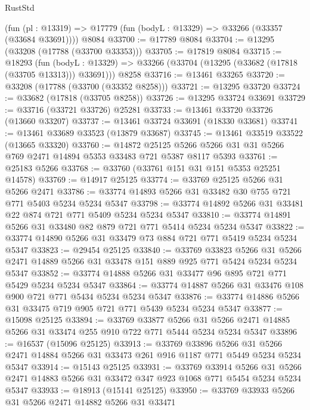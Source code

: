 \begin{lexlean}{RustStd}
\begin{coremodule}
    (fun (pl : @13319) => @17779 (fun (bodyL : @13329) => @33266 (@33357 (@33684 @33691))))
    @8084
@33700 := @17789 @8084
@33704 := @13295 (@33208 (@17788 (@33700 @33353)))
@33705 := @17819 @8084
@33715 := @18293
    (fun (bodyL : @13329) => @33266 (@33704 (@13295 (@33682 (@17818 (@33705 @13313))) @33691)))
    @8258
@33716 := @13461 @33265
@33720 := @33208 (@17788 (@33700 (@33352 @8258)))
@33721 := @13295 @33720
@33724 := @33682 (@17818 (@33705 @8258))
@33726 := @13295 @33724 @33691
@33729 := @33716 (@33721 @33726) @25281
@33733 := @13461 @33720 @33726 (@13660 @33207)
@33737 := @13461 @33724 @33691 (@18330 @33681)
@33741 := @13461 @33689 @33523 (@13879 @33687)
@33745 := @13461 @33519 @33522 (@13665 @33320)
@33760 := @14872
    @25125
    @5266
    @5266
    @31
    @31
    @5266
    @769
    @2471
    @14894
    @5353
    @33483
    @721
    @5387
    @8117
    @5393
@33761 := @25183 @5266
@33768 := @33760 (@33761 @151 @31 @151 @5353 @25251 @14578)
@33769 := @14917 @25125
@33774 := @33769 @25125 @5266 @31 @5266 @2471
@33786 := @33774 @14893 @5266 @31 @33482 @30 @755 @721 @771 @5403 @5234 @5234 @5347
@33798 := @33774 @14892 @5266 @31 @33481 @22 @874 @721 @771 @5409 @5234 @5234 @5347
@33810 := @33774 @14891 @5266 @31 @33480 @82 @879 @721 @771 @5414 @5234 @5234 @5347
@33822 := @33774 @14890 @5266 @31 @33479 @73 @884 @721 @771 @5419 @5234 @5234 @5347
@33823 := @29454 @25125
@33840 := @33769
    @33823
    @5266
    @31
    @5266
    @2471
    @14889
    @5266
    @31
    @33478
    @151
    @889
    @925
    @771
    @5424
    @5234
    @5234
    @5347
@33852 := @33774 @14888 @5266 @31 @33477 @96 @895 @721 @771 @5429 @5234 @5234 @5347
@33864 := @33774 @14887 @5266 @31 @33476 @108 @900 @721 @771 @5434 @5234 @5234 @5347
@33876 := @33774 @14886 @5266 @31 @33475 @719 @905 @721 @771 @5439 @5234 @5234 @5347
@33877 := @15098 @25125
@33894 := @33769
    @33877
    @5266
    @31
    @5266
    @2471
    @14885
    @5266
    @31
    @33474
    @255
    @910
    @722
    @771
    @5444
    @5234
    @5234
    @5347
@33896 := @16537 (@15096 @25125)
@33913 := @33769
    @33896
    @5266
    @31
    @5266
    @2471
    @14884
    @5266
    @31
    @33473
    @261
    @916
    @1187
    @771
    @5449
    @5234
    @5234
    @5347
@33914 := @15143 @25125
@33931 := @33769
    @33914
    @5266
    @31
    @5266
    @2471
    @14883
    @5266
    @31
    @33472
    @347
    @923
    @1068
    @771
    @5454
    @5234
    @5234
    @5347
@33933 := @18913 (@15141 @25125)
@33950 := @33769
    @33933
    @5266
    @31
    @5266
    @2471
    @14882
    @5266
    @31
    @33471

\end{coremodule}
\end{lexlean}
